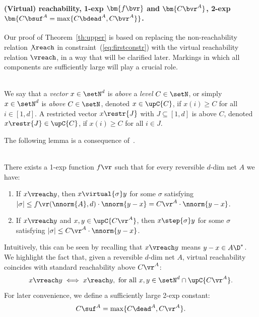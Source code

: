 \paragraph{(Virtual) reachability, 1-exp
$\bm{f\bvr}$ and $\bm{C\bvr^A}$, 2-exp $\bm{C\bsuf^A=\max\{C\bdead^A,C\bvr^A\}}$.}
Our proof of Theorem~\ref{th:upper} is based on replacing
the non-reachability relation $\not\reach$ in 
constraint~(\ref{eq:firstconstr}) with the virtual reachability relation
$\vreach$, in a way that will be clarified later. 
Markings in which all components are sufficiently large will play a
crucial role.

\begin{defi}
\hfill\\
We say that a \emph{vector} $x\in\setN^d$ is \emph{above} a
\emph{level} $C\in\setN$, or simply
$x\in\setN^d$ is \emph{above} $C\in\setN$, denoted
 $x\in\upC{C}$,	if $x(i)\geq C$ for all $i\in[1,d]$.
	A restricted vector
	$x\restr{J}$ with 
	$J\subseteq[1,d]$ is above $C$,
	denoted $x\restr{J}\in\upC{C}$, if  $x(i)\geq C$ for all $i\in
	J$.
\end{defi}

\noindent
The following lemma is a consequence of~\cite[Lemma~5]{DBLP:conf/fsttcs/Leroux19}.

\begin{lem}\label{lem:fvr}
\hfill\\	
	There exists a 1-exp function $f\vr$ such that 
for every reversible $d$-dim net $A$ we have:
	\begin{enumerate}
		\item
If $x\vreach y$, then  $x\virtual{\sigma}y$
for some $\sigma$ satisfying
			$|\sigma|\leq
			f\vr(\nnorm{A},d)\cdot\nnorm{y-x}=
		C\vr^A\cdot \nnorm{y-x}$.
\item
If $x\vreach y$
			and  $x,y\in\upC{C\vr^A}$, 
	then $x\step{\sigma}y$
	for some $\sigma$ satisfying
$|\sigma|\leq
		C\vr^A\cdot \nnorm{y-x}$.
	\end{enumerate}
	\end{lem}
\noindent
Intuitively, this can be seen by recalling that $x\vreach y$ means
$y-x\in A\D^*$. 
We highlight the fact that, given a reversible $d$-dim net $A$,  virtual reachability coincides with
standard reachability above $C\vr^A$:
\begin{equation*}
	x\vreach y\iff x\reach y,\text{ for all
	}x,y\in\setN^d\cap \upC{C\vr^A}.
\end{equation*}
For later convenience, we define a sufficiently large 2-exp
constant:
\begin{equation}\label{eq:Csuf}
C\suf^A=\max\{C\dead^A,C\vr^A\}.
\end{equation}


